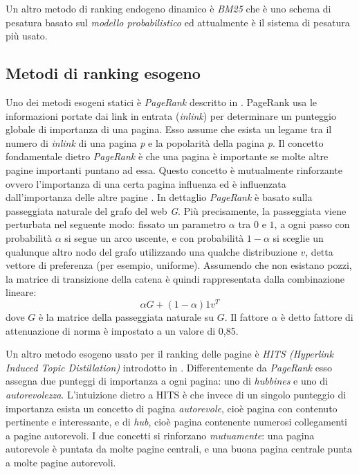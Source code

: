 Un altro metodo di ranking endogeno dinamico è \textit{BM25} \cite{Robertson:2009:PRF:1704809.1704810} che è uno schema di pesatura basato sul \textit{modello probabilistico} ed attualmente è il sistema di pesatura più usato. 

\subsection{Metodi di ranking esogeno}
Uno dei metodi esogeni statici è \textit{PageRank} descritto in \cite{ilprints422}. PageRank usa le informazioni portate dai link in entrata (\textit{inlink}) per determinare un punteggio globale di importanza di una pagina. Esso assume che esista un legame tra il numero di \textit{inlink} di una pagina \textit{p} e la popolarità della pagina \textit{p}. Il concetto fondamentale dietro \textit{PageRank} è che una pagina è importante se molte altre pagine importanti puntano ad essa. Questo concetto è mutualmente rinforzante ovvero l'importanza di una certa pagina influenza ed è influenzata dall'importanza delle altre pagine \cite{ilprints646}. In dettaglio \textit{PageRank} è basato sulla passeggiata naturale del grafo del web \textit{G}. Più precisamente, la passeggiata viene perturbata nel seguente modo: fissato un parametro \(\alpha\) tra \(0\) e \(1\), a ogni passo con probabilità \(\alpha\) si segue un arco uscente, e con probabilità \(1- \alpha \) si sceglie un qualunque altro nodo del grafo utilizzando una 
qualche 
distribuzione \(v\), detta
vettore di preferenza (per esempio, uniforme). Assumendo che non esistano pozzi, la matrice di transizione della catena è quindi rappresentata dalla combinazione lineare:
\begin{equation}
 \alpha G + (1 - \alpha) 1 v^T
\end{equation}
dove \(G\) è la matrice della passeggiata naturale su \(G\). Il fattore \(\alpha\) è detto fattore di attenuazione di norma è impostato a un valore di 0,85.

Un altro metodo esogeno usato per il ranking delle pagine è \textit{HITS (Hyperlink Induced Topic Distillation)} introdotto in \cite{Kleinberg:1999:ASH:324133.324140}. Differentemente da \textit{PageRank} esso assegna due punteggi di importanza a ogni pagina: uno di \textit{hubbines} e uno di \textit{autorevolezza}. L’intuizione dietro a HITS è che invece di un singolo punteggio di importanza esista un concetto di pagina \textit{autorevole}, cioè pagina con contenuto pertinente e interessante, e di \textit{hub}, cioè pagina contenente numerosi collegamenti a pagine autorevoli. I due concetti si rinforzano \textit{mutuamente}: una pagina autorevole è puntata da molte pagine centrali, e una buona pagina centrale punta a molte pagine autorevoli.

